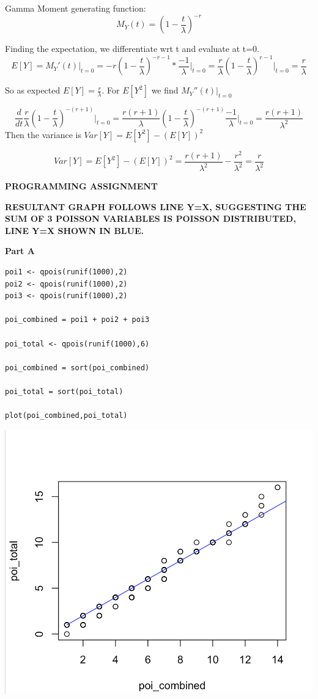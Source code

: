 \documentclass[svgnames]{article}
\begin{document}
Gamma Moment generating function:
$$ M_Y(t) = (1 - \frac{t}{\lambda})^{-r}$$

Finding the expectation, we differentiate wrt t and evaluate at t=0.
$$E[Y] = M_Y'(t)\Big|_{t=0} = -r(1 - \frac{t}{\lambda})^{-r-1}*\frac{-1}{\lambda}\Big|_{t=0}=\frac{r}{\lambda}(1-\frac{t}{\lambda})^{r-1}\Big|_{t=0}=\frac{r}{\lambda}$$

So as expected $E[Y] =\frac{r}{\lambda}$.
\newline
\newline
For $E[Y^2]$ we find $M_Y''(t)\Big|_{t=0}$

$$\frac{d}{dt}\frac{r}{\lambda}(1-\frac{t}{\lambda})^{-(r+1)}\Big|_{t=0}=\frac{r(r+1)}{\lambda}(1-\frac{t}{\lambda})^{-(r+1)}\frac{-1}{\lambda}\Big|_{t=0}=\frac{r(r+1)}{\lambda^2}$$
\newline
\newline
Then the variance is $Var[Y]=E[Y^2]-(E[Y])^2$

$$Var[Y]=E[Y^2]-(E[Y])^2=\frac{r(r+1)}{\lambda^2}-\frac{r^2}{\lambda^2}=\frac{r}{\lambda^2}$$



\textbf{PROGRAMMING ASSIGNMENT}

\textbf{RESULTANT GRAPH FOLLOWS LINE Y=X, SUGGESTING THE SUM OF 3 POISSON VARIABLES IS POISSON DISTRIBUTED, LINE Y=X SHOWN IN BLUE.}

\textbf{Part A}
\begin{lstlisting}
poi1 <- qpois(runif(1000),2)
poi2 <- qpois(runif(1000),2)
poi3 <- qpois(runif(1000),2)

poi_combined = poi1 + poi2 + poi3

poi_total <- qpois(runif(1000),6)

poi_combined = sort(poi_combined)

poi_total = sort(poi_total)

plot(poi_combined,poi_total)
\end{lstlisting}

\includegraphics[scale=.65]{PoissonSUM}
\end{document}
